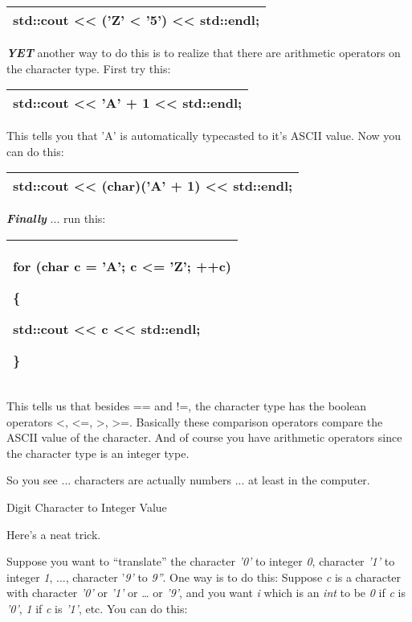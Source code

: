 \documentclass[
]{article}
\begin{document}
\begin{longtable}[]{@{}l@{}}
\toprule
\endhead
std::cout \textless\textless{} ('Z' \textless{} '5')
\textless\textless{} std::endl;\tabularnewline
\bottomrule
\end{longtable}

\emph{\textbf{YET}} another way to do this is to realize that there are
arithmetic operators on the character type. First try this:

\begin{longtable}[]{@{}l@{}}
\toprule
\endhead
std::cout \textless\textless{} 'A' + 1 \textless\textless{}
std::endl;\tabularnewline
\bottomrule
\end{longtable}

This tells you that 'A' is automatically typecasted to it's ASCII value.
Now you can do this:

\begin{longtable}[]{@{}l@{}}
\toprule
\endhead
std::cout \textless\textless{} (char)('A' + 1) \textless\textless{}
std::endl;\tabularnewline
\bottomrule
\end{longtable}

\emph{\textbf{Finally}} ... run this:

\begin{longtable}[]{@{}l@{}}
\toprule
\endhead
\begin{minipage}[t]{0.97\columnwidth}\raggedright
for (char c = 'A'; c \textless= 'Z'; ++c)

\{

std::cout \textless\textless{} c \textless\textless{} std::endl;

\}\strut
\end{minipage}\tabularnewline
\bottomrule
\end{longtable}

This tells us that besides == and !=, the character type has the boolean
operators \textless, \textless=, \textgreater, \textgreater=. Basically
these comparison operators compare the ASCII value of the character. And
of course you have arithmetic operators since the character type is an
integer type.

So you see ... characters are actually numbers ... at least in the
computer.

Digit Character to Integer Value

Here's a neat trick.

Suppose you want to ``translate'' the character \emph{'0'} to integer
\emph{0}, character \emph{'1'} to integer \emph{1}, ..., character
'\emph{9'} to \emph{9''}. One way is to do this: Suppose \emph{c} is a
character with character \emph{'0'} or \emph{'1'} or \ldots{} or
\emph{'9'}, and you want \emph{i} which is an \emph{int} to be \emph{0}
if \emph{c} is \emph{'0'}, \emph{1} if \emph{c} is \emph{'1'}, etc. You
can do this:
\end{document}
